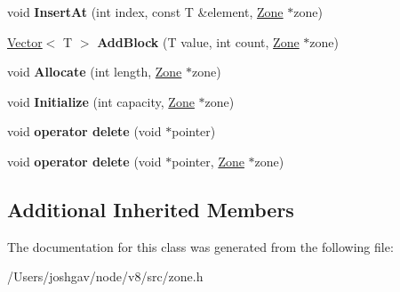 \begin{DoxyCompactItemize}
\item 
void {\bfseries Insert\+At} (int index, const T \&element, \hyperlink{classv8_1_1internal_1_1_zone}{Zone} $\ast$zone)\hypertarget{classv8_1_1internal_1_1_zone_list_a9b806a6d23f9dcdeee94eae91977414b}{}\label{classv8_1_1internal_1_1_zone_list_a9b806a6d23f9dcdeee94eae91977414b}

\item 
\hyperlink{classv8_1_1internal_1_1_vector}{Vector}$<$ T $>$ {\bfseries Add\+Block} (T value, int count, \hyperlink{classv8_1_1internal_1_1_zone}{Zone} $\ast$zone)\hypertarget{classv8_1_1internal_1_1_zone_list_ae912beeb5c111f281017bd8a1c6ce9d2}{}\label{classv8_1_1internal_1_1_zone_list_ae912beeb5c111f281017bd8a1c6ce9d2}

\item 
void {\bfseries Allocate} (int length, \hyperlink{classv8_1_1internal_1_1_zone}{Zone} $\ast$zone)\hypertarget{classv8_1_1internal_1_1_zone_list_a2b505dcaa9ff72b44f8196831a1e48ca}{}\label{classv8_1_1internal_1_1_zone_list_a2b505dcaa9ff72b44f8196831a1e48ca}

\item 
void {\bfseries Initialize} (int capacity, \hyperlink{classv8_1_1internal_1_1_zone}{Zone} $\ast$zone)\hypertarget{classv8_1_1internal_1_1_zone_list_ad5217fae97e20593db48ea8ed7073fab}{}\label{classv8_1_1internal_1_1_zone_list_ad5217fae97e20593db48ea8ed7073fab}

\item 
void {\bfseries operator delete} (void $\ast$pointer)\hypertarget{classv8_1_1internal_1_1_zone_list_ad34e89232a7e498218bab40cb231798d}{}\label{classv8_1_1internal_1_1_zone_list_ad34e89232a7e498218bab40cb231798d}

\item 
void {\bfseries operator delete} (void $\ast$pointer, \hyperlink{classv8_1_1internal_1_1_zone}{Zone} $\ast$zone)\hypertarget{classv8_1_1internal_1_1_zone_list_a92bd2e802a848cf5986f45a740c740c3}{}\label{classv8_1_1internal_1_1_zone_list_a92bd2e802a848cf5986f45a740c740c3}

\end{DoxyCompactItemize}
\subsection*{Additional Inherited Members}


The documentation for this class was generated from the following file\+:\begin{DoxyCompactItemize}
\item 
/\+Users/joshgav/node/v8/src/zone.\+h\end{DoxyCompactItemize}
